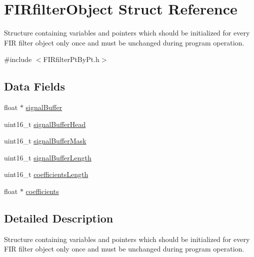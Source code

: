\hypertarget{struct_f_i_rfilter_object}{}\section{F\+I\+Rfilter\+Object Struct Reference}
\label{struct_f_i_rfilter_object}


Structure containing variables and pointers which should be initialized for every F\+IR filter object only once and must be unchanged during program operation.  




{\ttfamily \#include $<$F\+I\+Rfilter\+Pt\+By\+Pt.\+h$>$}

\subsection*{Data Fields}
\begin{DoxyCompactItemize}
\item 
float $\ast$ \mbox{\hyperlink{struct_f_i_rfilter_object_aae0d64d2a7939f8302edb830dc123c86_aae0d64d2a7939f8302edb830dc123c86}{signal\+Buffer}}
\item 
uint16\+\_\+t \mbox{\hyperlink{struct_f_i_rfilter_object_af41fd03c2023df9d8b4ce391377ef584_af41fd03c2023df9d8b4ce391377ef584}{signal\+Buffer\+Head}}
\item 
uint16\+\_\+t \mbox{\hyperlink{struct_f_i_rfilter_object_a3c833068892d3855a15079c572c1936c_a3c833068892d3855a15079c572c1936c}{signal\+Buffer\+Mask}}
\item 
uint16\+\_\+t \mbox{\hyperlink{struct_f_i_rfilter_object_ae88c8be8c92f567c52541641d6cad892_ae88c8be8c92f567c52541641d6cad892}{signal\+Buffer\+Length}}
\item 
uint16\+\_\+t \mbox{\hyperlink{struct_f_i_rfilter_object_a2e7b6600f7f4a3f9eccd7b7d6c0799a0_a2e7b6600f7f4a3f9eccd7b7d6c0799a0}{coefficients\+Length}}
\item 
float $\ast$ \mbox{\hyperlink{struct_f_i_rfilter_object_adc634462fd82995ba67a6a50ce478b6f_adc634462fd82995ba67a6a50ce478b6f}{coefficients}}
\end{DoxyCompactItemize}


\subsection{Detailed Description}
Structure containing variables and pointers which should be initialized for every F\+IR filter object only once and must be unchanged during program operation. 

